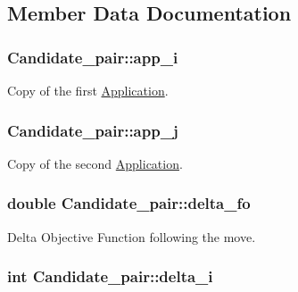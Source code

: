 \subsection{Member Data Documentation}
\hypertarget{classCandidate__pair_acc570b14122b1f3cbc0e5440778cd4d8}{
\subsubsection[{app\-\_\-i}]{ Candidate\-\_\-pair\-::app\-\_\-i\hspace{0.3cm}{\ttfamily [private]}}}\label{classCandidate__pair_acc570b14122b1f3cbc0e5440778cd4d8}


Copy of the first \hyperlink{classApplication}{Application}. 

\hypertarget{classCandidate__pair_a7497fbea2f53cb71a01486e2b655880e}{
\subsubsection[{app\-\_\-j}]{ Candidate\-\_\-pair\-::app\-\_\-j\hspace{0.3cm}{\ttfamily [private]}}}\label{classCandidate__pair_a7497fbea2f53cb71a01486e2b655880e}


Copy of the second \hyperlink{classApplication}{Application}. 

\hypertarget{classCandidate__pair_a190b95c0ee800a6b37fec8f5d84c62c6}{
\subsubsection[{delta\-\_\-fo}]{\setlength{\rightskip}{0pt plus 5cm}double Candidate\-\_\-pair\-::delta\-\_\-fo\hspace{0.3cm}{\ttfamily [private]}}}\label{classCandidate__pair_a190b95c0ee800a6b37fec8f5d84c62c6}


Delta Objective Function following the move. 

\hypertarget{classCandidate__pair_af9ed12a88dc27e921764feea5d1369f1}{
\subsubsection[{delta\-\_\-i}]{\setlength{\rightskip}{0pt plus 5cm}int Candidate\-\_\-pair\-::delta\-\_\-i\hspace{0.3cm}{\ttfamily [private]}}}\label{classCandidate__pair_af9ed12a88dc27e921764feea5d1369f1}


